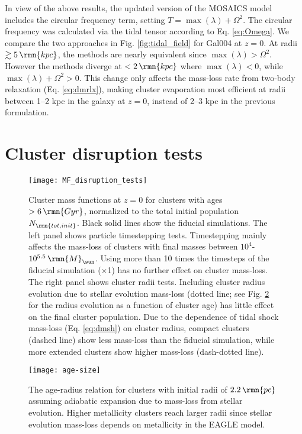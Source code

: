 \documentclass[fleqn,usenatbib]{mnras}
\newcommand\Msun{\,\rmn{M}_{\sun}}
\newcommand\Gyr{\,\rmn{Gyr}}
\newcommand\pc{\,\rmn{pc}}
\newcommand\kpc{\,\rmn{kpc}}
\begin{document}
In view of the above results, the updated version of the MOSAICS model includes the circular frequency term, setting $T = \max(\lambda) + \Omega^2$. The circular frequency was calculated via the tidal tensor according to Eq. \ref{eq:Omega}. We compare the two approaches in Fig. \ref{fig:tidal_field} for Gal004 at $z=0$. At radii $\gtrsim 5 \kpc$, the methods are nearly equivalent since $\max(\lambda) > \Omega^2$. However the methods diverge at $< 2 \kpc$ where $\max(\lambda) < 0$, while $\max(\lambda)+\Omega^2 > 0$.
This change only affects the mass-loss rate from two-body relaxation (Eq. \ref{eq:dmrlx}), making cluster evaporation most efficient at radii between 1--2 kpc in the galaxy at $z=0$, instead of 2--3 kpc in the previous formulation.


\section{Cluster disruption tests} \label{app:disruption}

\begin{figure*}
  \texttt{[image: MF\_disruption\_tests]}
  \caption{ Cluster mass functions at $z=0$ for clusters with ages $> 6 \Gyr$, normalized to the total initial population $N_\rmn{tot,init}$. Black solid lines show the fiducial simulations. The left panel shows particle timestepping tests. Timestepping mainly affects the mass-loss of clusters with final masses between $10^4$-$10^{5.5} \Msun$. Using more than 10 times the timesteps of the fiducial simulation ($\times$1) has no further effect on cluster mass-loss. The right panel shows cluster radii tests. Including cluster radius evolution due to stellar evolution mass-loss (dotted line; see Fig. \ref{fig:age-size} for the radius evolution as a function of cluster age) has little effect on the final cluster population. Due to the dependence of tidal shock mass-loss (Eq. \ref{eq:dmsh}) on cluster radius, compact clusters (dashed line) show less mass-loss than the fiducial simulation, while more extended clusters show higher mass-loss (dash-dotted line). }
  \label{fig:disrupt_tests}
\end{figure*}

\begin{figure}
  \texttt{[image: age-size]}
  \caption{ The age-radius relation for clusters with initial radii of $2.2 \pc$ assuming adiabatic expansion due to mass-loss from stellar evolution. Higher metallicity clusters reach larger radii since stellar evolution mass-loss depends on metallicity in the EAGLE model. }
  \label{fig:age-size}
\end{figure}
\end{document}
